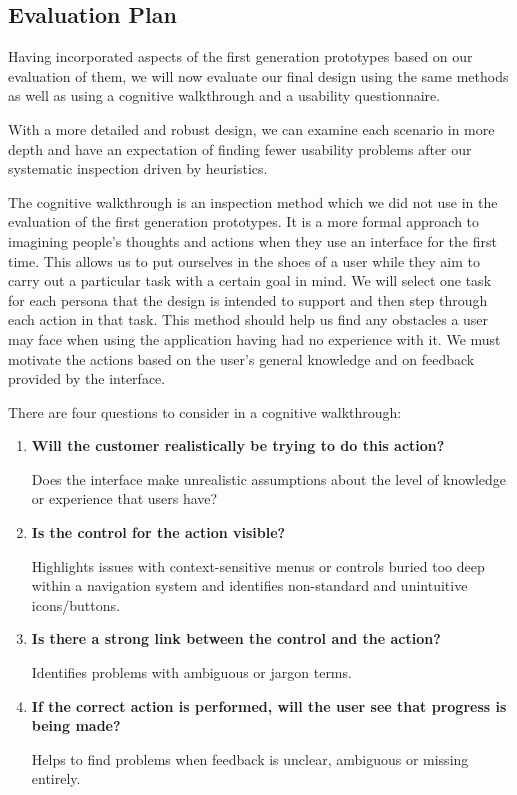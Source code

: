 \subsection{Evaluation Plan}
\label{sub:evaluation_plan}

Having incorporated aspects of the first generation prototypes based on our
evaluation of them, we will now evaluate our final design using the same
methods as well as using a cognitive walkthrough and a usability questionnaire.

With a more detailed and robust design, we can examine each scenario in more
depth and have an expectation of finding fewer usability problems after our
systematic inspection driven by heuristics.

The cognitive walkthrough is an inspection method which we did not use in the
evaluation of the first generation prototypes. It is a more formal approach to
imagining people's thoughts and actions when they use an interface for the
first time. This allows us to put ourselves in the shoes of a user while they
aim to carry out a particular task with a certain goal in mind. We will select
one task for each persona that the design is intended to support and then step
through each action in that task. This method should help us find any obstacles
a user may face when using the application having had no experience with it. We
must motivate the actions based on the user's general knowledge and on feedback
provided by the interface.

There are four questions to consider in a cognitive walkthrough\cite{cogwalk}:
\begin{enumerate}
	\item \textbf{Will the customer realistically be trying to do this action?}

	Does the interface make unrealistic assumptions about the level of
	knowledge or experience that users have?

	\item \textbf{Is the control for the action visible?}

	Highlights issues with context-sensitive menus or controls buried too deep
	within a navigation system and identifies non-standard and unintuitive
	icons/buttons.

	\item \textbf{Is there a strong link between the control and the action?}

	Identifies problems with ambiguous or jargon terms.

	\item \textbf{If the correct  action is performed, will the user see that
		progress is being made?}

	Helps to find problems when feedback is unclear, ambiguous or missing
	entirely.

\end{enumerate}
\bigskip

